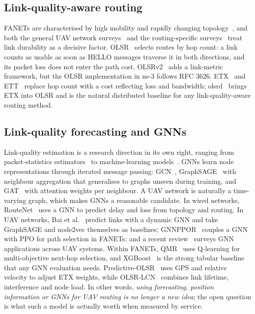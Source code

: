 \subsection{Link-quality-aware routing}
FANETs are characterised by high mobility and rapidly changing
topology~\cite{bekmezci}, and both the general UAV network
surveys~\cite{gupta,hayat} and the routing-specific
surveys~\cite{arafat,lakew} treat link durability as a decisive factor.
OLSR~\cite{rfc3626} selects routes by hop count: a link counts as usable as
soon as HELLO messages traverse it in both directions, and its packet loss does
not enter the path cost. OLSRv2~\cite{rfc7181} adds a link-metric framework, but
the OLSR implementation in ns-3 follows RFC 3626. ETX~\cite{decouto} and
ETT~\cite{draves} replace hop count with a cost reflecting loss and bandwidth;
olsrd~\cite{olsrd} brings ETX into OLSR and is the natural distributed baseline
for any link-quality-aware routing method.

\subsection{Link-quality forecasting and GNNs}
Link-quality estimation is a research direction in its own right, ranging from
packet-statistics estimators~\cite{baccour} to machine-learning
models~\cite{cerar}. GNNs learn node representations through iterated message
passing: GCN~\cite{kipf}, GraphSAGE~\cite{graphsage} with neighbour aggregation
that generalises to graphs unseen during training, and GAT~\cite{gat} with
attention weights per neighbour. A UAV network is naturally a time-varying
graph, which makes GNNs a reasonable candidate. In wired networks,
RouteNet~\cite{routenet} uses a GNN to predict delay and loss from topology and
routing. In UAV networks, Bai et al.~\cite{bai2025} predict links with a dynamic
GNN and take GraphSAGE and node2vec themselves as baselines;
GNNPPOR~\cite{gnnppor} couples a GNN with PPO for path selection in FANETs; and
a recent review~\cite{drones2026} surveys GNN applications across UAV systems.
Within FANETs, QMR~\cite{qmr} uses Q-learning for multi-objective next-hop
selection, and XGBoost~\cite{xgboost} is the strong tabular baseline that any
GNN evaluation needs. Predictive-OLSR~\cite{rosati2013} uses GPS and relative
velocity to adjust ETX weights, while OLSR-LCN~\cite{liu2025} combines link
lifetime, interference and node load. In other words, \emph{using forecasting,
position information or GNNs for UAV routing is no longer a new idea}; the open
question is what such a model is actually worth when measured by service.

